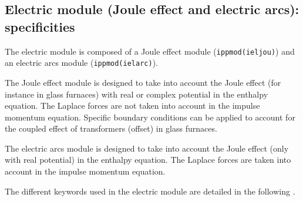 \subsection{Electric module (Joule effect and electric arcs): specificities}

The electric module is composed of a Joule effect module
(\texttt{ippmod(ieljou)}) and an electric arcs module
(\texttt{ippmod(ielarc)}).

The Joule effect module is designed to take into account the Joule effect
(for instance in glass furnaces) with real or complex potential in the
enthalpy equation. The Laplace forces are not taken into account in the
impulse momentum equation. Specific boundary conditions can be applied to
account for the coupled effect of transformers (offset) in glass furnaces.

The electric arcs module is designed to take into account the Joule effect
(only with real potential) in the enthalpy equation. The Laplace forces
are taken into account in the impulse momentum equation.

The different keywords used in the electric module are detailed in
the following .
